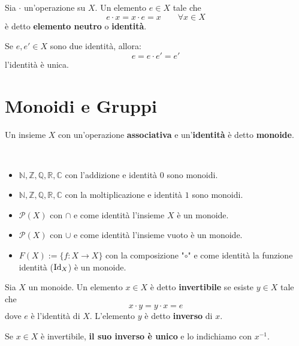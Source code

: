 \documentclass[../main.tex]{subfiles}
\begin{document}
\begin{definition}[Identità]
    Sia $\cdot$ un'operazione su $X$. Un elemento $e \in X$ tale che
    \[
        e \cdot x = x \cdot e = x \qquad \forall x \in X
    \]
    è detto \textbf{elemento neutro} o \textbf{identità}.
\end{definition}
\begin{remark}
    Se $e,e' \in X$ sono due identità, allora:
    \[
        e = e \cdot e' = e'
    \]
    l'identità è unica.
\end{remark}

\section{Monoidi e Gruppi}

\begin{definition}[Monoide]
    Un insieme $X$ con un'operazione \textbf{associativa} e un'\textbf{identità} è detto \textbf{monoide}.
\end{definition}

\begin{example}
    \
    \begin{itemize}
        \item $\mathbb{N,Z,Q,R,C}$ con l'addizione e identità $0$ sono monoidi.
        \item $\mathbb{N,Z,Q,R,C}$ con la moltiplicazione e identità $1$ sono monoidi.
        \item $\mathcal{P} (X)$ con $\cap$  e come identità l'insieme $X$ è un monoide.
        \item $\mathcal{P} (X)$ con $\cup$  e come identità l'insieme vuoto è un monoide.
        \item $F(X):= \{f: X \rightarrow X\}$ con la composizione "$\circ$" e come identità la funzione identità ($\operatorname{Id}_X$) è un monoide.
    \end{itemize}
\end{example}

\begin{definition}
    Sia $X$ un monoide. Un elemento $x \in X$ è detto \textbf{invertibile} se esiste $y \in X$ tale che
    \[
        x \cdot y = y \cdot x = e
    \]
    dove $e$ è l'identità di $X$. L'elemento $y$ è detto \textbf{inverso} di $x$.
\end{definition}
\begin{remark}
    Se $x \in X$ è invertibile, \textbf{il suo inverso è unico} e lo indichiamo con $x^{-1}$.
\end{remark}
\end{document}
